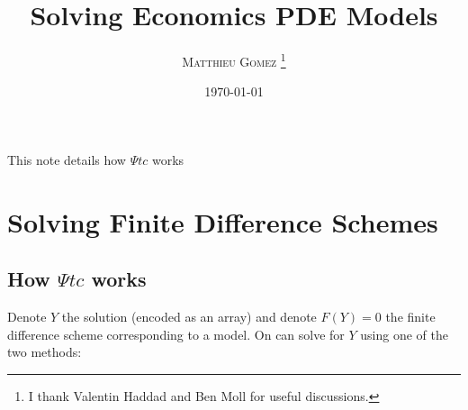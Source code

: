 \documentclass[english]{article}
\begin{document}
\title{Solving Economics PDE Models}
\author{\large{\textsc{Matthieu Gomez \thanks{I thank Valentin Haddad and Ben Moll for useful discussions.}}}}
\date{\today}
\maketitle
This note details how $\Psi tc$ works

\section{Solving Finite Difference Schemes}

\subsection{How $\Psi tc$ works}
Denote $Y$  the solution (encoded as an array) and denote $F(Y) = 0$ the finite difference scheme corresponding to a model. On can solve for $Y$ using one of the two methods:
\end{document}
